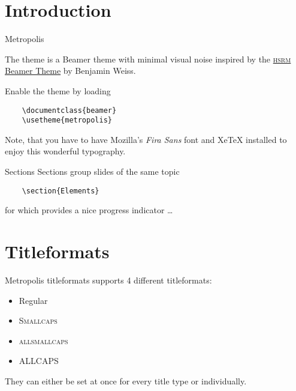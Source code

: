 \section[Intro]{Introduction}

\begin{frame}[fragile]{Metropolis}

  The \themename theme is a Beamer theme with minimal visual noise inspired by
  the \href{https://github.com/hsrmbeamertheme/hsrmbeamertheme}{\textsc{hsrm}
    Beamer Theme} by Benjamin Weiss.

  Enable the theme by loading

  \begin{verbatim}    \documentclass{beamer}
    \usetheme{metropolis}\end{verbatim}

  Note, that you have to have Mozilla's \emph{Fira Sans} font and XeTeX installed
  to enjoy this wonderful typography.
\end{frame}
\begin{frame}[fragile]{Sections}
  Sections group slides of the same topic

  \begin{verbatim}    \section{Elements}\end{verbatim}

  for which \themename provides a nice progress indicator \ldots

\end{frame}

\section{Titleformats}

\begin{frame}{Metropolis titleformats}
  \themename supports 4 different titleformats:
  \begin{itemize}
    \item Regular
    \item \textsc{Smallcaps}
    \item \textsc{allsmallcaps}
    \item ALLCAPS
  \end{itemize}
  They can either be set at once for every title type or individually.
\end{frame}

